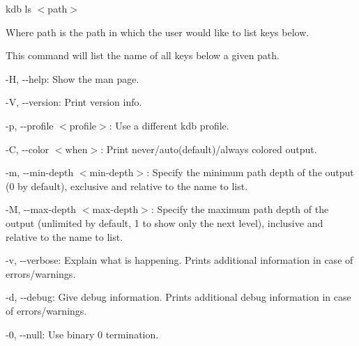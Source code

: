 {\ttfamily kdb ls $<$path$>$}

Where {\ttfamily path} is the path in which the user would like to list keys below.

This command will list the name of all keys below a given path.


\begin{DoxyItemize}
\item {\ttfamily -\/H}, {\ttfamily -\/-\/help}\+: Show the man page.
\item {\ttfamily -\/V}, {\ttfamily -\/-\/version}\+: Print version info.
\item {\ttfamily -\/p}, {\ttfamily -\/-\/profile $<$profile$>$}\+: Use a different kdb profile.
\item {\ttfamily -\/C}, {\ttfamily -\/-\/color $<$when$>$}\+: Print never/auto(default)/always colored output.
\item {\ttfamily -\/m}, {\ttfamily -\/-\/min-\/depth $<$min-\/depth$>$}\+: Specify the minimum path depth of the output (0 by default), exclusive and relative to the name to list.
\item {\ttfamily -\/M}, {\ttfamily -\/-\/max-\/depth $<$max-\/depth$>$}\+: Specify the maximum path depth of the output (unlimited by default, 1 to show only the next level), inclusive and relative to the name to list.
\item {\ttfamily -\/v}, {\ttfamily -\/-\/verbose}\+: Explain what is happening. Prints additional information in case of errors/warnings.
\item {\ttfamily -\/d}, {\ttfamily -\/-\/debug}\+: Give debug information. Prints additional debug information in case of errors/warnings.
\item {\ttfamily -\/0}, {\ttfamily -\/-\/null}\+: Use binary 0 termination.
\end{DoxyItemize}


